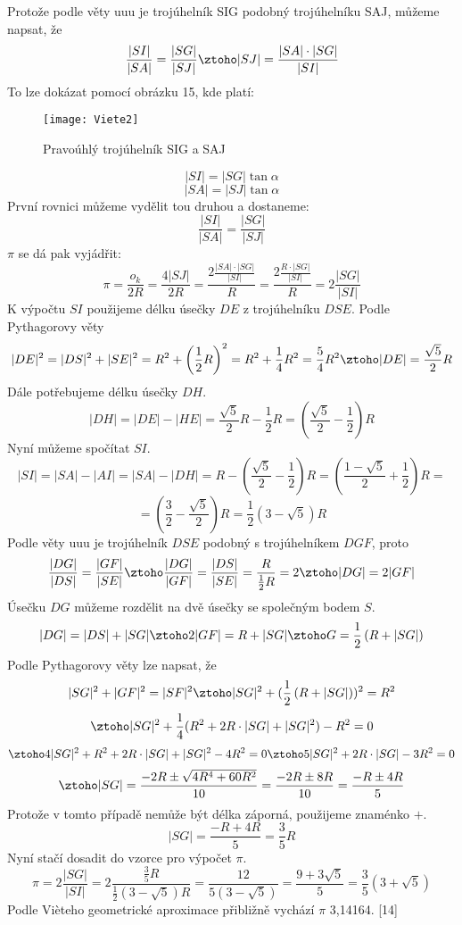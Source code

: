 \documentclass[soc]{gzwroc} %
\begin{document}
Protože podle věty uuu je trojúhelník SIG podobný trojúhelníku SAJ, můžeme napsat, že
$$
\frac{|SI|}{|SA|}=\frac{|SG|}{|SJ|} \ztoho |SJ|=\frac{|SA|\cdot |SG|}{|SI|}
$$
To lze dokázat pomocí obrázku 15, kde platí:
\begin{figure}[!ht]
\texttt{[image: Viete2]}
\caption{Pravoúhlý trojúhelník SIG a SAJ}
\label{fig:kruh}
\end{figure}
$$
|SI|=|SG| \tan \alpha
$$
$$
|SA|=|SJ| \tan \alpha
$$
První rovnici můžeme vydělit tou druhou a dostaneme:
$$
\frac{|SI|}{|SA|}=\frac{|SG|}{|SJ|}
$$
$\pi$ se dá pak vyjádřit:
$$
\pi=\frac{o_k}{2R}=\frac{4|SJ|}{2R}=\frac{2\frac{|SA|\cdot |SG|}{|SI|}}{R}=\frac{2\frac{R\cdot |SG|}{|SI|}}{R}=2\frac{|SG|}{|SI|}
$$
K výpočtu $SI$ použijeme délku úsečky $DE$ z trojúhelníku $DSE$. Podle Pythagorovy věty
$$
|DE|^2=|DS|^2+|SE|^2=R^2+\left(\frac{1}{2}R \right)^2=R^2+\frac{1}{4}R^2=\frac{5}{4}R^2 \ztoho |DE|=\frac{\sqrt{5}}{2}R
$$
Dále potřebujeme délku úsečky $DH$.
$$
|DH|=|DE|-|HE|=\frac{\sqrt{5}}{2}R-\frac{1}{2}R=\left(\frac{\sqrt{5}}{2}-\frac{1}{2}\right)R
$$
Nyní můžeme spočítat $SI$.
$$
|SI|=|SA|-|AI|=|SA|-|DH|=R-\left(\frac{\sqrt{5}}{2}-\frac{1}{2}\right)R=\left(\frac{1-\sqrt{5}}{2}+\frac{1}{2}\right)R=
$$
$$
=\left(\frac{3}{2}-\frac{\sqrt{5}}{2}\right)R=\frac{1}{2}\left(3-\sqrt{5}\right)R
$$
Podle věty uuu je trojúhelník $DSE$ podobný s trojúhelníkem $DGF$, proto
$$
\frac{|DG|}{|DS|}=\frac{|GF|}{|SE|} \ztoho \frac{|DG|}{|GF|}=\frac{|DS|}{|SE|}=\frac{R}{\frac{1}{2}R}=2 \ztoho |DG|=2|GF|
$$
Úsečku $DG$ můžeme rozdělit na dvě úsečky se společným bodem $S$.
$$
|DG|=|DS|+|SG| \ztoho 2|GF|=R+|SG| \ztoho G=\frac{1}{2} \left(R+|SG|\right)
$$
Podle Pythagorovy věty lze napsat, že
$$
|SG|^2+|GF|^2=|SF|^2 \ztoho |SG|^2+(\frac{1}{2}\left(R+|SG|\right))^2=R^2
$$
$$
\ztoho |SG|^2+\frac{1}{4}(R^2+2R\cdot |SG| +|SG|^2)-R^2=0 
$$
$$
\ztoho 4|SG|^2 +R^2+2R\cdot |SG|+|SG|^2-4R^2=0 \ztoho 5|SG|^2+2R\cdot |SG|-3R^2=0 
$$
$$
\ztoho |SG|=\frac{-2R\pm \sqrt{4R^4+60R^2}}{10}=\frac{-2R\pm 8R}{10}=\frac{-R\pm 4R}{5}
$$
Protože v tomto případě nemůže být délka záporná, použijeme znaménko $+$.
$$
|SG|=\frac{-R+4R}{5}=\frac{3}{5}R
$$
Nyní stačí dosadit do vzorce pro výpočet $\pi$.
$$
\pi=2\frac{|SG|}{|SI|}=2\frac{\frac{3}{5}R}{\frac{1}{2}\left(3-\sqrt{5}\right)R}=\frac{12}{5\left(3-\sqrt{5}\right)}=\frac{9+3\sqrt{5}}{5}=\frac{3}{5}(3+\sqrt{5})
$$
Podle Vièteho geometrické aproximace přibližně vychází $\pi$ 3,14164. [14]
\end{document}
